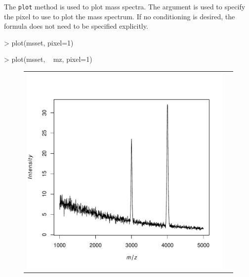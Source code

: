 \documentclass{article}
\begin{document}
The \verb|plot| method is used to plot mass spectra. The  argument is used to specify the pixel to use to plot the mass spectrum. If no conditioning is desired, the formula does not need to be specified explicitly.
\begin{Schunk}
\begin{Sinput}
> plot(msset, pixel=1)
\end{Sinput}
\end{Schunk}
\begin{Schunk}
\begin{Sinput}
> plot(msset, ~ mz, pixel=1)
\end{Sinput}
\end{Schunk}
\begin{figure}
\begin{center}
\begin{tabular}{cc}
\includegraphics{Cardinal-plotting-011}
&

\end{tabular}
\end{center}
\end{figure}
\end{document}
